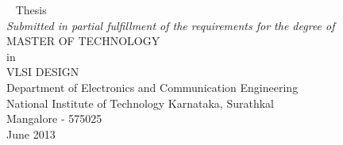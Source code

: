 \documentclass[a4paper,12pt]{report}
\begin{document}
\begin{titlepage}
\begin{center}
\
\vspace{10pt}
 {Thesis}  \\
{\emph {Submitted in partial fulfillment of the requirements for the degree of}} \\
\vspace{10pt}
{\Large {MASTER OF TECHNOLOGY}}\\
\vspace{5pt}
in\\
\vspace{5pt}
{ \Large {VLSI DESIGN}}\\
\vspace{.5cm}
{\Large Department of Electronics and Communication Engineering }\\
\vspace{0.2cm}
{\Large National Institute of Technology Karnataka, Surathkal}\\
\vspace{0.2cm}
{\Large Mangalore - 575025}\\
\vspace{0.5cm}
{\large June 2013}\\
\end{center}
\end{titlepage}

\newpage
\thispagestyle{empty}

\newpage
\thispagestyle{empty}

\newpage
{}
\pagestyle{plain}
\newpage
\pagestyle{plain}


\newpage
\tableofcontents 
{}

\newpage
\listoffigures
{}
\end{document}
